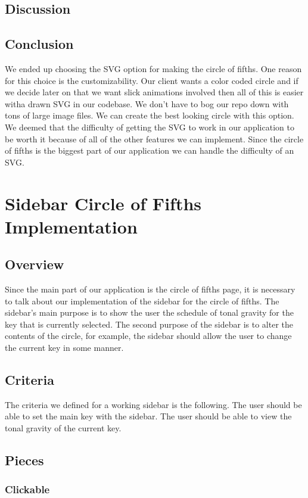 \documentclass[onecolumn, draftclsnofoot,10pt, compsoc]{IEEEtran}
\begin{document}
\subsection{Discussion}
\subsection{Conclusion}
We ended up choosing the SVG option for making the circle of fifths.
One reason for this choice is the customizability.
Our client wants a color coded circle and if we decide later on that we want slick animations involved then all of this is easier witha  drawn SVG in our codebase.
We don't have to bog our repo down with tons of large image files.
We can create the best looking circle with this option.
We deemed that the difficulty of getting the SVG to work in our application to be worth it because of all of the other features we can implement.
Since the circle of fifths is the biggest part of our application we can handle the difficulty of an SVG.

\section{Sidebar Circle of Fifths Implementation}
\subsection{Overview}
Since the main part of our application is the circle of fifths page, it is necessary to talk about our implementation of the sidebar for the circle of fifths.
The sidebar's main purpose is to show the user the schedule of tonal gravity for the key that is currently selected.
The second purpose of the sidebar is to alter the contents of the circle, for example, the sidebar should allow the user to change the current key in some manner.

\subsection{Criteria}
The criteria we defined for a working sidebar is the following.
The user should be able to set the main key with the sidebar.
The user should be able to view the tonal gravity of the current key.

\subsection{Pieces}
\subsubsection{Clickable}
\end{document}

